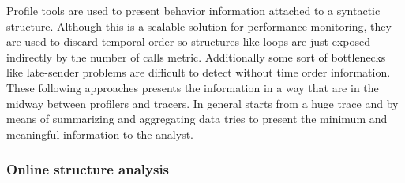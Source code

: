 Profile tools are used to present behavior information attached to a 
syntactic structure. Although this is a scalable
solution for performance monitoring, they are used to discard temporal order so
structures like loops are just exposed indirectly by the number of calls metric.
Additionally some sort of bottlenecks like late-sender problems are difficult to
detect without time order information. These following approaches presents the
information in a way that are in the midway between profilers and tracers. In
general starts from a huge trace and by means of summarizing and aggregating
data tries to present the minimum and meaningful information to the analyst.

\subsubsection{Online structure analysis}

